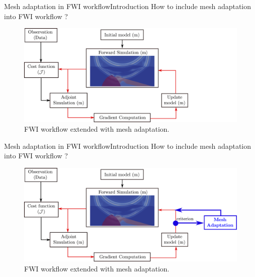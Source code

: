 
\begin{frame}{Mesh adaptation in FWI workflow}{Introduction}
  How to include mesh adaptation into FWI workflow ?
\begin{figure}[!htbp]
\centering
\includegraphics[scale=0.2]{image/fwi_workflow_mesh_adapt0.pdf}
\caption{FWI workflow extended with mesh adaptation.}
\label{fwi_workflow_mesh_extended}
\end{figure}
\end{frame}


\begin{frame}[noframenumbering]{Mesh adaptation in FWI workflow}{Introduction}
  How to include mesh adaptation into FWI workflow ?
\begin{figure}[!htbp]
\centering
\includegraphics[scale=0.2]{image/fwi_workflow_mesh_adapt.pdf}
\caption{FWI workflow extended with mesh adaptation.}
\label{fwi_workflow_mesh_extended}
\end{figure}
\end{frame}




